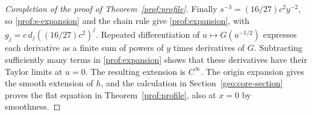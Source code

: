 \begin{proof}[Completion of the proof of Theorem~\ref{prof:profile}]
Finally $s^{-3}=(16/27)c^2y^{-2}$, so
\eqref{prof:s-expansion} and the chain rule give
\eqref{prof:expansion}, with
$g_j=c\,d_j((16/27)c^2)^j$.  Repeated differentiation of
$u\mapsto G(u^{-1/2})$ expresses each derivative as a finite sum of
powers of $y$ times derivatives of $G$.  Subtracting sufficiently many
terms in \eqref{prof:expansion} shows that these derivatives have their
Taylor limits at $u=0$.  The resulting extension is $C^\infty$.
The origin expansion gives the smooth extension of $h$, and the
calculation in Section~\ref{geo:core-section} proves the flat
equation in Theorem~\ref{prof:profile}, also at $x=0$ by smoothness.
\end{proof}
